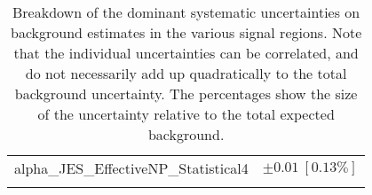 \begin{table}
\begin{center}
\begin{tabular*}{\textwidth}{@{\extracolsep{\fill}}lc}
alpha\_JES\_EffectiveNP\_Statistical4         & $\pm 0.01\ [0.13\%] $       \\
\noalign{\smallskip}\hline\noalign{\smallskip}
\end{tabular*}
\end{center}
\caption[Breakdown of uncertainty on background estimates]{
Breakdown of the dominant systematic uncertainties on background estimates in the various signal regions.
Note that the individual uncertainties can be correlated, and do not necessarily add up quadratically to 
the total background uncertainty. The percentages show the size of the uncertainty relative to the total expected background.
\label{table.results.bkgestimate.uncertainties.SRHMEM_mct2}}
\end{table}
%